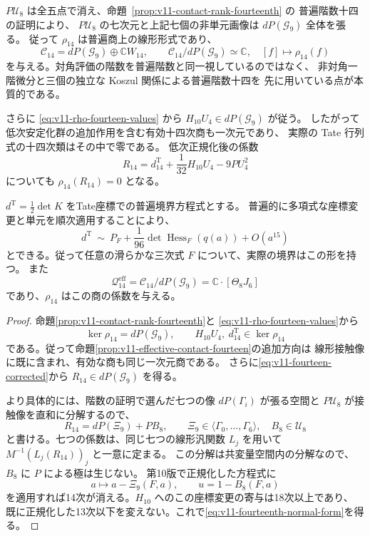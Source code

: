 \(P\mathcal U_8\) は全五点で消え、命題~\ref{prop:v11-contact-rank-fourteenth} の
普遍階数十四の証明により、
\(P\mathcal U_8\) の七次元と上記七個の非単元画像は \(dP(\mathcal G_9)\) 全体を張る。
従って \(\rho_{14}\) は普遍商上の線形形式であり、
\[
 \mathcal C_{14}=dP(\mathcal G_9)\oplus\mathbb C W_{14},\qquad
 \mathcal C_{14}/dP(\mathcal G_9)\simeq\mathbb C,
 \quad [f]\longmapsto\rho_{14}(f)
\]
を与える。対角評価の階数を普遍階数と同一視しているのではなく、
非対角一階微分と三個の独立な Koszul 関係による普遍階数十四を
先に用いている点が本質的である。

さらに \eqref{eq:v11-rho-fourteen-values} から
\(H_{10}U_4\in dP(\mathcal G_9)\) が従う。
したがって低次安定化群の追加作用を含む有効十四次商も一次元であり、
実際の Tate 行列式の十四次類はその中で零である。
低次正規化後の係数
\[
 R_{14}=d^{\mathrm T}_{14}+\frac1{32}H_{10}U_4-9PU_4^2
\]
についても \(\rho_{14}(R_{14})=0\) となる。

\begin{theorem}
\label{thm:v11-fourteenth-normal-form}
$d^{\mathrm T}=\frac12\det K$ をTate座標での普遍境界方程式とする。
普遍的に多項式な座標変更と単元を順次適用することにより、
\begin{equation}\label{eq:v11-fourteenth-normal-form}
 d^{\mathrm T}\ \sim\
 P_F+\frac1{96}\det\operatorname{Hess}_F(q(a))+O(a^{15})
\end{equation}
とできる。従って任意の滑らかな三次式 $F$ について、実際の境界はこの形を持つ。
また
\[
 \mathcal Q^{\mathrm{eff}}_{14}
   =\mathcal C_{14}/dP(\mathcal G_9)
   =\mathbb C\cdot[\Theta_8J_6]
\]
であり、$\rho_{14}$ はこの商の係数を与える。
\end{theorem}
\begin{proof}
命題\ref{prop:v11-contact-rank-fourteenth}と
\eqref{eq:v11-rho-fourteen-values}から
\[
 \ker\rho_{14}=dP(\mathcal G_9),\qquad
 H_{10}U_4,\ d^{\mathrm T}_{14}\in\ker\rho_{14}
\]
である。従って命題\ref{prop:v11-effective-contact-fourteen}の追加方向は
線形接触像に既に含まれ、有効な商も同じ一次元商である。
さらに\eqref{eq:v11-fourteen-corrected}から $R_{14}\in dP(\mathcal G_9)$ を得る。

より具体的には、階数の証明で選んだ七つの像 $dP(\Gamma_i)$ が張る空間と
$P\mathcal U_8$ が接触像を直和に分解するので、
\[
 R_{14}=dP(\Xi_9)+P B_8,\qquad
 \Xi_9\in\langle\Gamma_0,\ldots,\Gamma_6\rangle,\quad B_8\in\mathcal U_8
\]
と書ける。七つの係数は、同じ七つの線形汎関数 $L_j$ を用いて
$M^{-1}(L_j(R_{14}))_j$ と一意に定まる。
この分解は共変量空間内の分解なので、$B_8$ に $P$ による極は生じない。
第10版で正規化した方程式に
\[
 a\longmapsto a-\Xi_9(F,a),\qquad
 u=1-B_8(F,a)
\]
を適用すれば14次が消える。$H_{10}$ へのこの座標変更の寄与は18次以上であり、
既に正規化した13次以下を変えない。これで\eqref{eq:v11-fourteenth-normal-form}を得る。
\end{proof}


